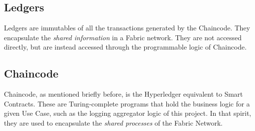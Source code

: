	\subsection{Ledgers}
		\hspace{10mm}Ledgers are immutables of all the transactions generated by the Chaincode. They encapsulate the \textit{shared information} in a Fabric network. They are not accessed directly, but are instead accessed through the programmable logic of Chaincode.\\
				
	\subsection{Chaincode}
		\hspace{10mm}Chaincode, as mentioned briefly before, is the Hyperledger equivalent to Smart Contracts. These are Turing-complete programs that hold the business logic for a given Use Case, such as the logging aggregator logic of this project. In that spirit, they are used to encapsulate the \textit{shared processes} of the Fabric Network.\\
